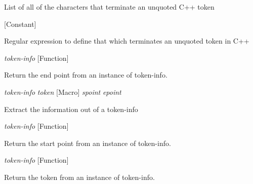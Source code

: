 \begin{doc-string}
List of all of the characters that terminate an unquoted C++ token
\end{doc-string}

\vspace{1em}
\noindent
{}
\usebox{\funcname}
 \hfill [Constant]

\begin{doc-string}
Regular expression to define that which terminates an unquoted token in C++
\end{doc-string}

\vspace{1em}
\noindent
{}
\usebox{\funcname}\emph{token-info}
 \hfill [Function]

\begin{doc-string}
Return the end point from an instance of token-info.
\end{doc-string}

\vspace{1em}
\noindent
{}
\usebox{\funcname}\emph{token-info} \emph{token}
 \hfill [Macro]
\hspace*{\wd\funcname}\emph{spoint} \emph{epoint}
\hspace*{\wd\funcname}

\begin{doc-string}
Extract the information out of a token-info
\end{doc-string}

\vspace{1em}
\noindent
{}
\usebox{\funcname}\emph{token-info}
 \hfill [Function]

\begin{doc-string}
Return the start point from an instance of token-info.
\end{doc-string}

\vspace{1em}
\noindent
{}
\usebox{\funcname}\emph{token-info}
 \hfill [Function]

\begin{doc-string}
Return the token from an instance of token-info.
\end{doc-string}

